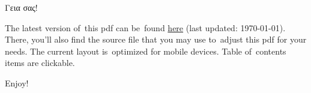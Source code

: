 \documentclass[12pt]{extarticle}
\newenvironment{page}{\clearpage\normalsize\null\vfill}{\vfill\null}
\begin{document}
	\pagestyle{empty}
    \setlength{\tabcolsep}{3pt}
    \setlength{\parindent}{0pt}

    \begin{page}
         Γεια σας!

        The latest version of~this pdf can be~found
        \href{https://github.com/alexanderskulikov/greek}{here}
        (last updated: \today{}).
        There, you'll also find the source file that you may use
        to~adjust this pdf for your needs. The current layout
        is~optimized for mobile devices. Table of~contents items
        are clickable.

        Enjoy!
    \end{page}

    \clearpage
    \footnotesize
	\tableofcontents
	\centering
\end{document}

